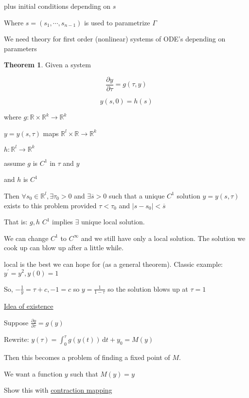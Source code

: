 \documentclass{article}
\theoremstyle{definition}
\newtheorem{theorem}{Theorem}
\begin{document}
plus initial conditions depending on \(s\) 

Where \(s = (s_1,\cdots, s_{n-1})\) is used to parametrize \(\Gamma\)

We need theory for first order (nonlinear) systems of ODE's depending on parameters

\begin{theorem}
    Given a system

    \[
        \frac{\partial y}{\partial \tau} = g(\tau, y)
    \]

    \[
        y(s,0) = h(s)
    \]

    where \(g: \mathbb{R} \times \mathbb{R}^k \to \mathbb{R}^k\)
    
    \(y = y(s,\tau)\) maps \(\mathbb{R} ^l \times \mathbb{R} \to \mathbb{R} ^k\)
    
    \(h: \mathbb{R}^l \to \mathbb{R}^k\)
    
    assume \(g\) is \(C^1\) in \(\tau\) and \(y\) 

    and \(h\) is \(C^1\) 

    Then \(\forall s_0\in\mathbb{R}^l, \exists \tau_0 > 0\) and \(\exists \overline{s} > 0\) such that a unique \(C^1\) solution \(y = y(s,\tau)\) exists to this problem provided \(\tau < \tau_0\) and \(\vert s - s_0 \vert < \overline{s} \) 

\end{theorem}

That is: \(g,h\) \(C^1\) implies \(\exists\) unique local solution.

We can change \(C^1\) to \(C^{\infty}\) and we still have only a local solution. The solution we cook up can blow up after a little while.

local is the best we can hope for (as a general theorem). Classic example: \(y^{\prime} = y^2, y(0)=1\)

So, \(- \frac{1}{y} = \tau + c, -1 = c\) so \(y = \frac{1}{1-\tau}\) so the solution blows up at \(\tau = 1\) 

\underline{Idea of existence} 

Suppose \(\frac{\partial y}{\partial \tau} = g(y)\)

Rewrite: \(y(\tau) = \int_{0}^{\tau} g(y(t)) \,\mathrm{d}t + y_0 = M(y)\)

Then this becomes a problem of finding a fixed point of \(M\).

We want a function \(y\) such that \(M(y) = y\)

Show this with \underline{contraction mapping}
\end{document}
